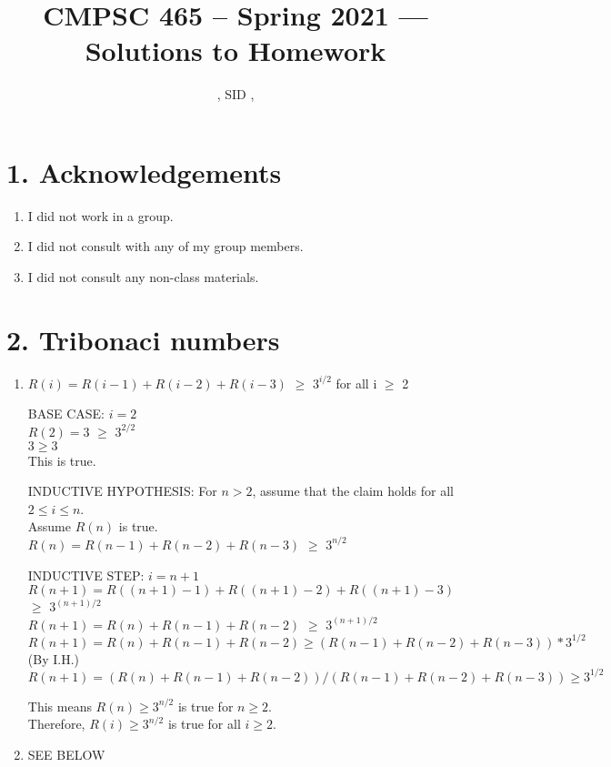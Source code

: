 \documentclass[11pt]{article}
\title{CMPSC 465 -- Spring 2021 --- Solutions to Homework \Homework}
\author{\Name, SID \SID, \texttt{\Login}}
\newenvironment{qparts}{\begin{enumerate}[{(}a{)}]}{\end{enumerate}}
\begin{document}
\maketitle

\section*{1. Acknowledgements}
\begin{qparts}
\item
I did not work in a group.
\item
I did not consult with any of my group members.
\item
I did not consult any non-class materials.
\end{qparts}


\newpage
\section*{2. Tribonaci numbers}
\begin{qparts}
\item
$R(i) = R(i-1) + R(i-2) + R(i-3)$ $\geq$ $3^{i/2}$ for all i $\geq$ 2 

BASE CASE: $i = 2$ \\
$R(2) = 3$ $\geq$ $3^{2/2}$ \\
$3 \geq 3$ \\
This is true.  

INDUCTIVE HYPOTHESIS: For $n > 2$, assume that the claim holds for all $2 \leq i \leq n$. \\
Assume $R(n)$ is true. \\
$R(n) = R(n-1) + R(n-2) + R(n-3)$ $\geq$ $3^{n/2}$

INDUCTIVE STEP: $i = n+1$ \\
$R(n+1) = R((n+1)-1) + R((n+1)-2) + R((n+1)-3)$ $\geq$ $3^{(n+1)/2}$ \\
$R(n+1) = R(n) + R(n-1) + R(n-2)$ $\geq$ $3^{(n+1)/2}$
$R(n+1) = R(n) + R(n-1) + R(n-2) \geq (R(n-1) + R(n-2) + R(n-3))*3^{1/2}$ (By I.H.)\\
$R(n+1) = {(R(n) + R(n-1) + R(n-2))}/{(R(n-1) + R(n-2) +R(n-3))} \geq 3^{1/2}$

This means $R(n) \geq 3^{n/2}$ is true for $n \geq 2$.\\
Therefore, $R(i) \geq 3^{n/2}$ is true for all $i \geq 2$.





\item
SEE BELOW
\end{qparts}
\end{document}
